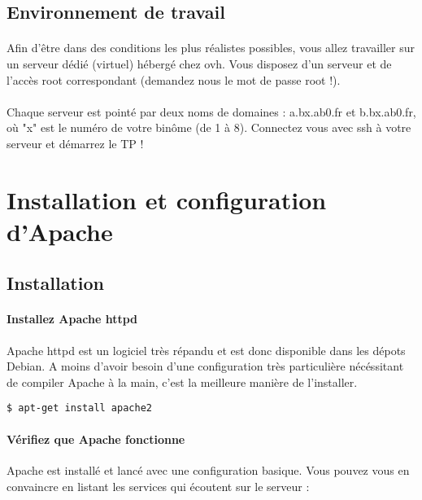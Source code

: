 \documentclass[12pt,a4paper]{article}
\begin{document}
\subsection*{Environnement de travail}
\paragraph{}
Afin d'être dans des conditions les plus réalistes possibles, vous allez travailler sur un serveur dédié (virtuel) hébergé chez ovh. Vous disposez d'un serveur et de l'accès root correspondant (demandez nous le mot de passe root !).

\paragraph{}
Chaque serveur est pointé par deux noms de domaines : a.bx.ab0.fr et b.bx.ab0.fr, où "x" est le numéro de votre binôme (de 1 à 8). Connectez vous avec ssh à votre serveur et démarrez le TP !

\section{Installation et configuration d'Apache}
\subsection{Installation}

\paragraph{Installez Apache httpd\\}
Apache httpd est un logiciel très répandu et est donc disponible dans les dépots Debian. A moins d'avoir besoin d'une configuration très particulière nécéssitant de compiler Apache à la main, c'est la meilleure manière de l'installer.

\begin{lstlisting}
$ apt-get install apache2
\end{lstlisting}

\paragraph{Vérifiez que Apache fonctionne\\}
Apache est installé et lancé avec une configuration basique. Vous pouvez vous en convaincre en listant les services qui écoutent sur le serveur : 
\end{document}
